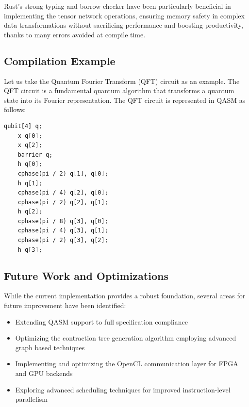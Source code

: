 \documentclass[12pt,oneside,a4paper]{article}
\begin{document}
Rust's strong typing and borrow checker have been particularly beneficial in implementing the tensor network operations, ensuring memory safety in complex data transformations without sacrificing performance and boosting productivity, thanks to many errors avoided at compile time.

\subsection{Compilation Example}

Let us take the Quantum Fourier Transform (QFT)\cite{coppersmith2002approximatefouriertransformuseful} circuit as an example. The QFT circuit is a fundamental quantum algorithm that transforms a quantum state into its Fourier representation. The QFT circuit is represented in QASM as follows:

\begin{lstlisting}[style=qasm, caption={QFT Circuit in QASM}]
	qubit[4] q;
	x q[0];
	x q[2];
	barrier q;
	h q[0];
	cphase(pi / 2) q[1], q[0];
	h q[1];
	cphase(pi / 4) q[2], q[0];
	cphase(pi / 2) q[2], q[1];
	h q[2];
	cphase(pi / 8) q[3], q[0];
	cphase(pi / 4) q[3], q[1];
	cphase(pi / 2) q[3], q[2];
	h q[3];
\end{lstlisting}


\subsection{Future Work and Optimizations}

While the current implementation provides a robust foundation, several areas for future improvement have been identified:

\begin{itemize}
    \item Extending QASM support to full specification compliance
    \item Optimizing the contraction tree generation algorithm employing advanced graph based techniques \cite{PhysRevE.90.033315}
    \item Implementing and optimizing the OpenCL communication layer for FPGA and GPU backends
    \item Exploring advanced scheduling techniques for improved instruction-level parallelism
\end{itemize}
\end{document}
